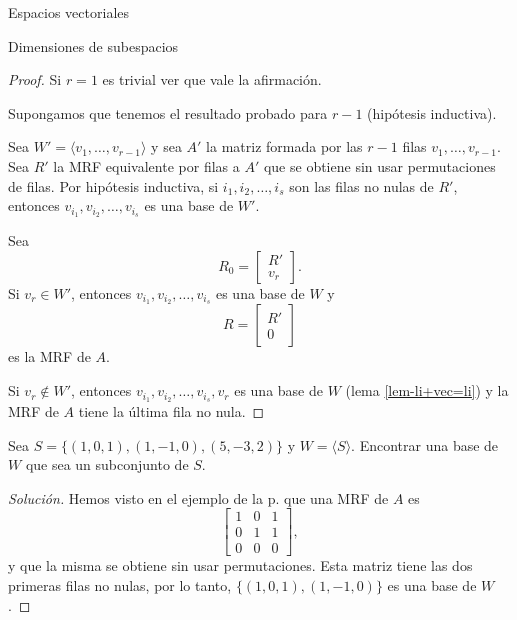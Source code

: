 \begin{chapter}{Espacios vectoriales}
\begin{section}{Dimensiones de subespacios}
\begin{proof}
        Si $r = 1$ es trivial ver que vale la afirmación. 
        
        Supongamos que tenemos el resultado probado para $r-1$ (hipótesis inductiva).
    	
        Sea $W' = \langle  v_1,\ldots, v_{r-1} \rangle$ y sea $A'$ la matriz formada por las $r-1$ filas $v_1,\ldots, v_{r-1}$. 		
        Sea $R'$ la MRF equivalente por filas a $A'$ que se obtiene sin usar permutaciones de filas. Por hipótesis inductiva, si $i_1,i_2,\ldots,i_s$ son las filas no nulas de $R'$,  entonces $v_{i_1},v_{i_2},\ldots,v_{i_s}$ es una base de $W'$.
        
        Sea
        \begin{equation*}
            R_0 = \begin{bmatrix}
            R' \\ v_r
            \end{bmatrix}.
        \end{equation*}
        Si $v_r \in W'$, entonces  $v_{i_1},v_{i_2},\ldots,v_{i_s}$ es una base de $W$ y 
        \begin{equation*}
        R = \begin{bmatrix}
        R' \\ 0
        \end{bmatrix}
        \end{equation*}
        es la MRF de $A$.
        
        Si $v_r \not\in W'$, entonces  $v_{i_1},v_{i_2},\ldots,v_{i_s}, v_r$ es una base de $W$ (lema \ref{lem-li+vec=li}) y la MRF de $A$ tiene la última fila no nula.  
    \end{proof}


    \begin{ejemplo*}
        Sea $S = \{(1,0,1),(1,-1,0), (5,-3,2)\}$ y $W = \langle S\rangle$. Encontrar una base de $W$ que sea un subconjunto de $S$. 
    \end{ejemplo*}
    \begin{proof}[Solución] Hemos visto en el ejemplo de la p. \pageref{ej-4.5} que una  MRF de $A$  es 
        \begin{equation*}
            \begin{bmatrix} 1&0&1\\0&1&1\\0&0&0 \end{bmatrix},
        \end{equation*}
        y que la misma se obtiene sin usar permutaciones. Esta matriz tiene las dos primeras filas no nulas, por lo tanto, $\{(1,0,1),(1,-1,0)\}$ es una base de $W$.
    \end{proof}


\end{section}
\end{chapter}
